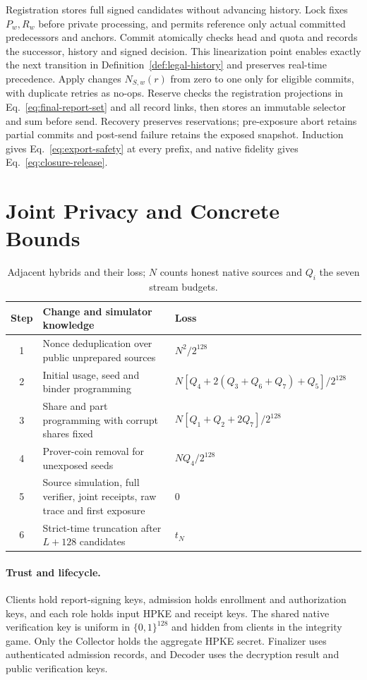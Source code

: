 \documentclass[conference,compsoc]{IEEEtran}
\theoremstyle{definition}
\numberwithin{equation}{section}
\numberwithin{table}{section}
\numberwithin{figure}{section}
\theoremstyle{plain}
\begin{document}
\label{app:closure-proof}
Registration stores full signed candidates without advancing history. Lock fixes
\(P_w,R_w\) before private processing, and permits reference only actual committed
predecessors and anchors. Commit atomically checks head and quota and records
the successor, history and signed decision. This linearization point enables
exactly the next transition in Definition~\ref{def:legal-history} and
preserves real-time precedence. Apply changes \(N_{S,w}(r)\) from zero to one
only for eligible commits, with duplicate retries as no-ops. Reserve checks
the registration projections in Eq.~\eqref{eq:final-report-set} and all record links, then stores an
immutable selector and sum before send. Recovery preserves reservations;
pre-exposure abort retains partial commits and post-send failure retains the
exposed snapshot. Induction gives Eq.~\eqref{eq:export-safety} at every
prefix, and native fidelity gives Eq.~\eqref{eq:closure-release}.

\section{Joint Privacy and Concrete Bounds}
\label{app:native-theory}

\begin{table}[t]
\centering
\caption{Adjacent hybrids and their loss; \(N\) counts honest native sources
and \(Q_i\) the seven stream budgets.}
\label{tab:hybrid-ledger}
\footnotesize
\begin{tabularx}{\textwidth}{@{}clYr@{}}
\toprule
Step & Change and simulator knowledge & Loss \\
 & Nonce deduplication over public unprepared sources & \(N^2/2^{128}\) \\
2 & Initial usage, seed and binder programming & \(N[Q_4+2(Q_3+Q_6+Q_7)+Q_5]/2^{128}\) \\
3 & Share and part programming with corrupt shares fixed & \(N[Q_1+Q_2+2Q_7]/2^{128}\) \\
4 & Prover-coin removal for unexposed seeds & \(NQ_4/2^{128}\) \\
5 & Source simulation, full verifier, joint receipts, raw trace and first exposure & \(0\) \\
6 & Strict-time truncation after \(L+128\) candidates & \(t_N\) \\
\bottomrule
\end{tabularx}
\end{table}

\paragraph{Trust and lifecycle.}
\label{app:trust-lifecycle}
Clients hold report-signing keys, admission holds enrollment and authorization
keys, and each role holds input HPKE and receipt keys. The shared native
verification key is uniform in \(\{0,1\}^{128}\) and hidden from clients in
the integrity game. Only the Collector holds the aggregate HPKE secret.
Finalizer uses authenticated admission records, and Decoder uses the decryption
result and public verification keys.
\end{document}
